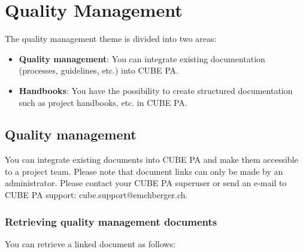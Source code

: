 
\pagebreak
\section{Quality Management}

The quality management theme is divided into two areas: 

\vspace{\baselineskip}

\begin{itemize}
\item
\textbf{Quality management}: You can integrate existing documentation (processes, guidelines, etc.) into CUBE PA.
\item
\textbf{Handbooks}: You have the possibility to create structured documentation such as project handbooks, etc. in CUBE PA.
\end{itemize}

\vspace{\baselineskip}

\subsection{Quality management}

You can integrate existing documents into CUBE PA and make them accessible to a project team. Please note that document links can only be made by an administrator. Please contact your CUBE PA superuser or send an e-mail to CUBE PA support: {\color{red} cube.support@emchberger.ch}.

\subsubsection{Retrieving quality management documents}

You can retrieve a linked document as follows:

\vspace{\baselineskip}

